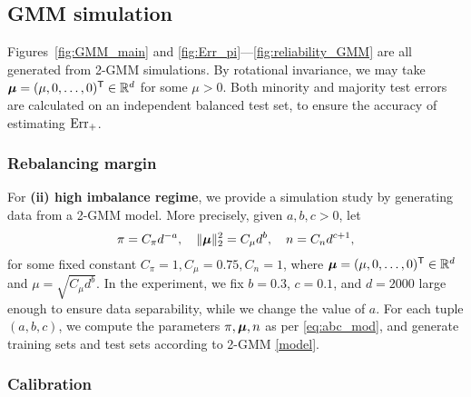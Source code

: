 
\subsection{GMM simulation}

Figures~\ref{fig:GMM_main} and \ref{fig:Err_pi}---\ref{fig:reliability_GMM} are all generated from 2-GMM simulations. By rotational invariance, we may take $\text{\boldmath $\mu$} = (\mu, 0, \ldots, 0)^{\sf T} \in \mathbb{R}^d$ for some $\mu > 0$. Both minority and majority test errors are calculated on an independent balanced test set, to ensure the accuracy of estimating $\mathrm{Err}_+$.

\subsubsection{Rebalancing margin}

For \textbf{(ii) high imbalance regime}, we provide a simulation study by generating data from a 2-GMM model. More precisely, given $a, b, c > 0$, let
\begin{equation}\label{eq:abc_mod}
    \pi = C_\pi d^{-a},  \quad  \|\text{\boldmath $\mu$}\|_2^2 = C_{\mu} d^b,  \quad  n = C_n d^{c+1},
\end{equation}
for some fixed constant $C_\pi = 1, C_\mu = 0.75, C_n = 1$, where $\text{\boldmath $\mu$} = (\mu, 0, \ldots, 0)^{\sf T} \in \mathbb{R}^d$ and $\mu = \sqrt{C_{\mu} d^b}$. In the experiment, we fix $b = 0.3$, $c = 0.1$, and $d =2 000$ large enough to ensure data separability, while we change the value of $a$. For each tuple $(a, b, c)$, we compute the parameters $\pi, \text{\boldmath $\mu$}, n$ as per \cref{eq:abc_mod}, and generate training sets and test sets according to 2-GMM \cref{model}. 

\subsubsection{Calibration}


